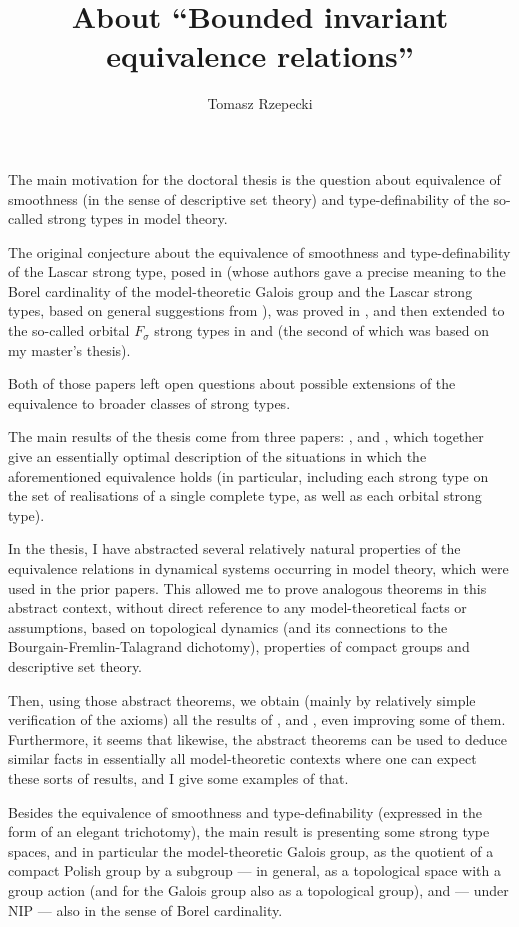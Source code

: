 \documentclass[12pt,a4paper]{article}
\title{About ``Bounded invariant equivalence relations''}
\author{Tomasz Rzepecki}
\date{}
\begin{document}
	\maketitle
	The main motivation for the doctoral thesis is the question about equivalence of smoothness (in the sense of descriptive set theory) and type-definability of the so-called strong types in model theory.
	
	The original conjecture about the equivalence of smoothness and type-definability of the Lascar strong type, posed in \cite{KPS13} (whose authors gave a precise meaning to the Borel cardinality of the model-theoretic Galois group and the Lascar strong types, based on general suggestions from \cite{CLPZ01}), was proved in \cite{KMS14}, and then extended to the so-called orbital $F_\sigma$ strong types in \cite{KM14} and \cite{KR16} (the second of which was based on my master's thesis).
	
	Both of those papers left open questions about possible extensions of  the equivalence to broader classes of strong types.
	
	The main results of the thesis come from three papers: \cite{KPR15}, \cite{Rz16} and \cite{KR18}, which together give an essentially optimal description of the situations in which the aforementioned equivalence holds (in particular, including each strong type on the set of realisations of a single complete type, as well as each orbital strong type).
	
	In the thesis, I have abstracted several relatively natural properties of the equivalence relations in dynamical systems occurring in model theory, which were used in the prior papers. This allowed me to prove analogous theorems in this abstract context, without direct reference to any model-theoretical facts or assumptions, based on topological dynamics (and its connections to the Bourgain-Fremlin-Talagrand dichotomy), properties of compact groups and descriptive set theory.
	
	Then, using those abstract theorems, we obtain (mainly by relatively simple verification of the axioms) all the results of \cite{KPR15}, \cite{Rz16} and \cite{KR18}, even improving some of them. Furthermore, it seems that likewise, the abstract theorems can be used to deduce similar facts in essentially all model-theoretic contexts where one can expect these sorts of results, and I give some examples of that.
	
	Besides the equivalence of smoothness and type-definability (expressed in the form of an elegant trichotomy), the main result is presenting some strong type spaces, and in particular the model-theoretic Galois group, as the quotient of a compact Polish group by a subgroup --- in general, as a topological space with a group action (and for the Galois group also as a topological group), and --- under NIP --- also in the sense of Borel cardinality.
	
\end{document}
